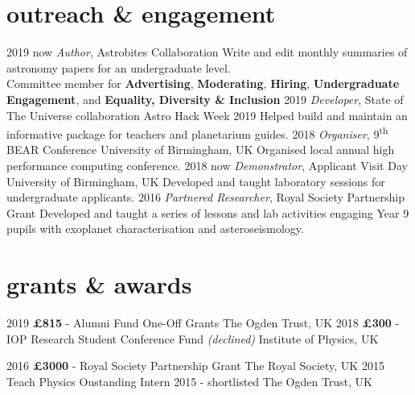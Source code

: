 \documentclass[]{k-cv} %
\begin{document}
\section{\color{c3}outreach \& engagement}
\begin{entrylist}
	\centry
	{2019 \to now}
	{\emph{Author}, Astrobites Collaboration}
	{}
	{Write and edit monthly summaries of astronomy papers for an undergraduate level. \\ Committee member for \textbf{\textcolor{c3}{Advertising}}, \textbf{\textcolor{c3}{Moderating}}, \textbf{\textcolor{c3}{Hiring}}, \textbf{\textcolor{c3}{Undergraduate Engagement}}, and \textbf{\textcolor{c3}{Equality, Diversity \& Inclusion}}}
	\centry
	{2019}
	{\emph{Developer}, State of The Universe collaboration}
	{Astro Hack Week 2019}
	{Helped build and maintain an informative package for teachers and planetarium guides.}
	\centry
	{2018 }
	{\emph{Organiser}, 9\textsuperscript{th} BEAR Conference}
	{University of Birmingham, UK}
	{Organised local annual high performance computing conference.}
	\centry
	{2018 \to now}
	{\emph{Demonstrator}, Applicant Visit Day}
	{University of Birmingham, UK}
	{Developed and taught laboratory sessions for undergraduate applicants.}
	\centry
	{2016 }
	{\emph{Partnered Researcher}, \textcolor{c3}{Royal Society Partnership Grant}}
	{}
	{Developed and taught a series of lessons and lab activities engaging Year 9 pupils with exoplanet characterisation and asteroseismology.}
\end{entrylist}

\section{\color{c4}grants \& awards}

\begin{entrylist}
	\entrythree
	{2019}
	{\textbf{\textcolor{c4}{\pounds 815}} - Alumni Fund One-Off Grants}
	{The Ogden Trust, UK}
	\entrythree
	{2018}
	{\textbf{\textcolor{c4}{\pounds 300}} - IOP Research Student Conference Fund \emph{(declined)}}
	{Institute of Physics, UK}
	
	\entrythree
	{2016}
	{\textbf{\textcolor{c4}{\pounds 3000}} - Royal Society Partnership Grant}
	{The Royal Society, UK}
	\entrythree
	{2015}
	{Teach Physics Oustanding Intern 2015 - shortlisted}
	{The Ogden Trust, UK}
	
\end{entrylist}
\end{document}
